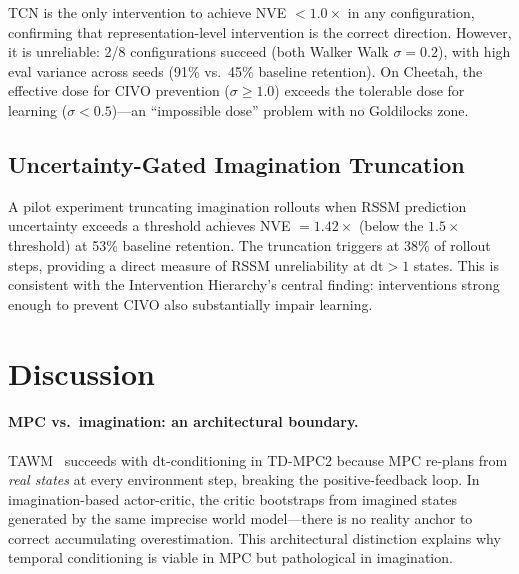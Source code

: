 \documentclass[10pt,letterpaper]{article}
\begin{document}
TCN is the only intervention to achieve NVE $< 1.0\times$ in any configuration, confirming that representation-level intervention is the correct direction.
However, it is unreliable: 2/8 configurations succeed (both Walker Walk $\sigma=0.2$), with high eval variance across seeds (91\% vs.\ 45\% baseline retention).
On Cheetah, the effective dose for CIVO prevention ($\sigma \geq 1.0$) exceeds the tolerable dose for learning ($\sigma < 0.5$)---an ``impossible dose'' problem with no Goldilocks zone.

\subsection{Uncertainty-Gated Imagination Truncation}

A pilot experiment truncating imagination rollouts when RSSM prediction uncertainty exceeds a threshold achieves NVE $= 1.42\times$ (below the $1.5\times$ threshold) at 53\% baseline retention.
The truncation triggers at 38\% of rollout steps, providing a direct measure of RSSM unreliability at $\mathrm{dt}>1$ states.
This is consistent with the Intervention Hierarchy's central finding: interventions strong enough to prevent CIVO also substantially impair learning.

\section{Discussion}

\paragraph{MPC vs.\ imagination: an architectural boundary.}
TAWM~\citep{nhu2025tawm} succeeds with dt-conditioning in TD-MPC2 because MPC re-plans from \emph{real states} at every environment step, breaking the positive-feedback loop.
In imagination-based actor-critic, the critic bootstraps from imagined states generated by the same imprecise world model---there is no reality anchor to correct accumulating overestimation.
This architectural distinction explains why temporal conditioning is viable in MPC but pathological in imagination.
\end{document}
